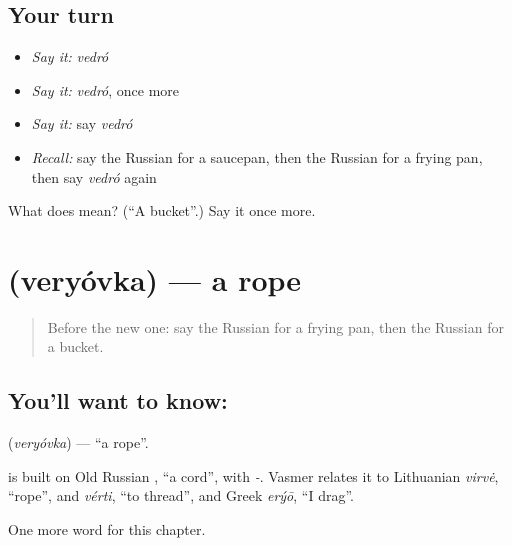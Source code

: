 \subsection*{Your turn}
\begin{itemize}
\raggedright
  \item \emph{Say it:} \emph{vedró}
  \item \emph{Say it:} \emph{vedró}, once more
  \item \emph{Say it:} say \emph{vedró}
  \item \emph{Recall:} say the Russian for a saucepan, then the Russian for a frying pan, then say \emph{vedró} again
\end{itemize}

\begin{tcolorbox}[breakable,colback=teal!4,colframe=teal!35!black,title={Before you move on}]
What does  mean? (\textquotedblleft{}A bucket\textquotedblright{}.) Say it once more.
\end{tcolorbox}
\section[\texorpdfstring{\ru{верёвка} (veryóvka)}{верёвка (veryóvka)}]{ (veryóvka) — a rope}

\label{lesson:RU-C98-rope}



\begin{quote}
Before the new one: say the Russian for a frying pan, then the Russian for a bucket.
\end{quote}

\subsection*{You'll want to know: }
\textbf{} (\emph{veryóvka}) — \textquotedblleft{}a rope\textquotedblright{}.

\begin{cousinweb}
\textbf{} is built on Old Russian \emph{}, \textquotedblleft{}a cord\textquotedblright{}, with \emph{-}. Vasmer relates it to Lithuanian \emph{virvė}, \textquotedblleft{}rope\textquotedblright{}, and \emph{vérti}, \textquotedblleft{}to thread\textquotedblright{}, and Greek \emph{erýō}, \textquotedblleft{}I drag\textquotedblright{}.
\end{cousinweb}

\begin{grammarlens}[title={What you've built}]
One more word for this chapter.
\end{grammarlens}

